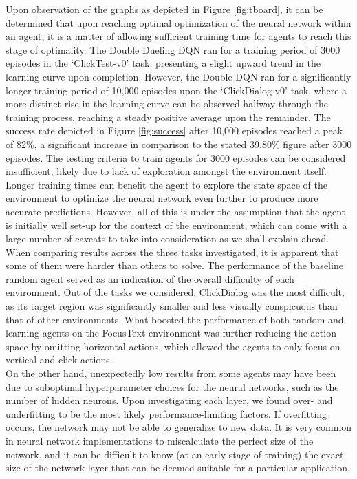 \documentclass[10pt,journal,compsoc]{IEEEtran}
\begin{document}
Upon observation of the graphs as depicted in Figure \ref{fig:tboard}, it can be determined that upon reaching optimal optimization of the neural network within an agent, it is a matter of allowing sufficient training time for agents to reach this stage of optimality. The Double Dueling DQN ran for a training period of 3000 episodes in the ‘ClickTest-v0’ task, presenting a slight upward trend in the learning curve upon completion. However, the Double DQN ran for a significantly longer training period of 10,000 episodes upon the ‘ClickDialog-v0’ task, where a more distinct rise in the learning curve can be observed halfway through the training process, reaching a steady positive average upon the remainder. The success rate depicted in Figure \ref{fig:success} after 10,000 episodes reached a peak of 82\%, a significant increase in comparison to the stated 39.80\% figure after 3000 episodes. The testing criteria to train agents for 3000 episodes  can be considered insufficient, likely due to lack of exploration amongst the environment itself. Longer training times can benefit the agent to explore the state space of the environment to optimize the neural network even further to produce more accurate predictions. However, all of this is under the assumption that the agent is initially well set-up for the context of the environment, which can come with a large number of caveats to take into consideration as we shall explain ahead. \\ 

When comparing results across the three tasks investigated, it is apparent that some of them were harder than others to solve. The performance of the baseline random agent served as an indication of the overall difficulty of each environment. Out of the tasks we considered, ClickDialog was the most difficult, as its target region was significantly smaller and less visually conspicuous than that of other environments. What boosted the performance of both random and learning agents on the FocusText environment was further reducing the action space by omitting horizontal actions, which allowed the agents to only focus on vertical and click actions. \\

On the other hand, unexpectedly low results from some agents may have been due to suboptimal hyperparameter choices for the neural networks, such as the number of hidden neurons. Upon investigating each layer, we found over- and underfitting to be the most likely performance-limiting factors. If overfitting occurs, the network may not be able to generalize to new data. It is very common in neural network implementations to miscalculate the perfect size of the network, and it can be difficult to know (at an early stage of training) the exact size of the network layer that can be deemed suitable for a particular application. \\
\end{document}
